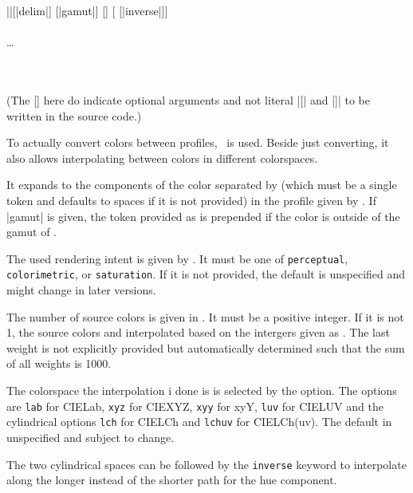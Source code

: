 \documentclass{l3doc}
\begin{document}
\begin{documentation}
\begin{function}{\ApplyProfile}
  \begin{syntax}
    |\ProfileInfo |[|delim|] [|gamut|] [] [ [|inverse|]]  \\
      \\
    \dots\\
      \\
     \\
  \end{syntax}
  (The [] here do indicate optional arguments and not literal |[| and |]| to be written in the source code.)

  To actually convert colors between profiles, \cmd\ApplyProfile\ is used. Beside just converting, it also allows interpolating between colors in different colorspaces.

  It expands to the components of the color separated by  (which must be a single token and defaults to spaces if it is not provided) in the profile given by .
  If |gamut| is given, the token provided as  is prepended if the color is outside of the gamut of .

  The used rendering intent is given by . It must be one of \texttt{perceptual}, \texttt{colorimetric}, or \texttt{saturation}. If it is not provided, the default is unspecified and might change in later versions.

  The number of source colors is given in .
  It must be a positive integer.
  If it is not 1, the source colors and interpolated based on the intergers given as .
  The last weight is not explicitly provided but automatically determined such that the sum of all weights is 1000.

  The colorspace the interpolation i done is is selected by the  option. The options are \texttt{lab} for CIELab, \texttt{xyz} for CIEXYZ, \texttt{xyy} for xyY, \texttt{luv} for CIELUV and the cylindrical options \texttt{lch} for CIELCh and \texttt{lchuv} for CIELCh(uv). The default in unspecified and subject to change.

  The two cylindrical spaces can be followed by the \texttt{inverse} keyword to interpolate along the longer instead of the shorter path for the hue component.


\end{function}
\end{documentation}
\end{document}
